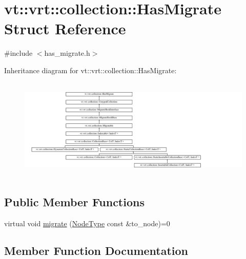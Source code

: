 \hypertarget{structvt_1_1vrt_1_1collection_1_1_has_migrate}{}\section{vt\+:\+:vrt\+:\+:collection\+:\+:Has\+Migrate Struct Reference}
\label{structvt_1_1vrt_1_1collection_1_1_has_migrate}


{\ttfamily \#include $<$has\+\_\+migrate.\+h$>$}

Inheritance diagram for vt\+:\+:vrt\+:\+:collection\+:\+:Has\+Migrate\+:\begin{figure}[H]
\begin{center}
\leavevmode
\includegraphics[height=4.873803cm]{structvt_1_1vrt_1_1collection_1_1_has_migrate}
\end{center}
\end{figure}
\subsection*{Public Member Functions}
\begin{DoxyCompactItemize}
\item 
virtual void \hyperlink{structvt_1_1vrt_1_1collection_1_1_has_migrate_a6cd6f43660771bf45e205e4c8ee7ff90}{migrate} (\hyperlink{namespacevt_a866da9d0efc19c0a1ce79e9e492f47e2}{Node\+Type} const \&to\+\_\+node)=0
\end{DoxyCompactItemize}


\subsection{Member Function Documentation}
\mbox{\label{structvt_1_1vrt_1_1collection_1_1_has_migrate_a6cd6f43660771bf45e205e4c8ee7ff90}} 
